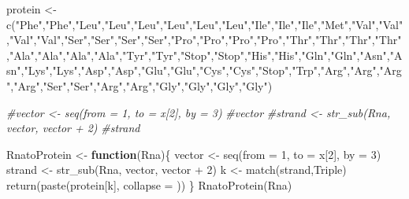 \documentclass[
]{article}
\newenvironment{Shaded}{\begin{snugshade}}{\end{snugshade}}
\newcommand{\AttributeTok}[1]{\textcolor[rgb]{0.77,0.63,0.00}{#1}}
\newcommand{\CommentTok}[1]{\textcolor[rgb]{0.56,0.35,0.01}{\textit{#1}}}
\newcommand{\ControlFlowTok}[1]{\textcolor[rgb]{0.13,0.29,0.53}{\textbf{#1}}}
\newcommand{\DecValTok}[1]{\textcolor[rgb]{0.00,0.00,0.81}{#1}}
\newcommand{\FunctionTok}[1]{\textcolor[rgb]{0.00,0.00,0.00}{#1}}
\newcommand{\NormalTok}[1]{#1}
\newcommand{\OtherTok}[1]{\textcolor[rgb]{0.56,0.35,0.01}{#1}}
\newcommand{\SpecialCharTok}[1]{\textcolor[rgb]{0.00,0.00,0.00}{#1}}
\newcommand{\StringTok}[1]{\textcolor[rgb]{0.31,0.60,0.02}{#1}}
\begin{document}
\begin{Shaded}
\begin{Highlighting}[]
\NormalTok{protein }\OtherTok{\textless{}{-}} \FunctionTok{c}\NormalTok{(}\StringTok{"Phe"}\NormalTok{,}\StringTok{"Phe"}\NormalTok{,}\StringTok{"Leu"}\NormalTok{,}\StringTok{"Leu"}\NormalTok{,}\StringTok{"Leu"}\NormalTok{,}\StringTok{"Leu"}\NormalTok{,}\StringTok{"Leu"}\NormalTok{,}\StringTok{"Leu"}\NormalTok{,}\StringTok{"Ile"}\NormalTok{,}\StringTok{"Ile"}\NormalTok{,}\StringTok{"Ile"}\NormalTok{,}\StringTok{"Met"}\NormalTok{,}\StringTok{"Val"}\NormalTok{,}\StringTok{"Val"}\NormalTok{,}\StringTok{"Val"}\NormalTok{,}\StringTok{"Val"}\NormalTok{,}\StringTok{"Ser"}\NormalTok{,}\StringTok{"Ser"}\NormalTok{,}\StringTok{"Ser"}\NormalTok{,}\StringTok{"Ser"}\NormalTok{,}\StringTok{"Pro"}\NormalTok{,}\StringTok{"Pro"}\NormalTok{,}\StringTok{"Pro"}\NormalTok{,}\StringTok{"Pro"}\NormalTok{,}\StringTok{"Thr"}\NormalTok{,}\StringTok{"Thr"}\NormalTok{,}\StringTok{"Thr"}\NormalTok{,}\StringTok{"Thr"}\NormalTok{,}\StringTok{"Ala"}\NormalTok{,}\StringTok{"Ala"}\NormalTok{,}\StringTok{"Ala"}\NormalTok{,}\StringTok{"Ala"}\NormalTok{,}\StringTok{"Tyr"}\NormalTok{,}\StringTok{"Tyr"}\NormalTok{,}\StringTok{"Stop"}\NormalTok{,}\StringTok{"Stop"}\NormalTok{,}\StringTok{"His"}\NormalTok{,}\StringTok{"His"}\NormalTok{,}\StringTok{"Gln"}\NormalTok{,}\StringTok{"Gln"}\NormalTok{,}\StringTok{"Asn"}\NormalTok{,}\StringTok{"Asn"}\NormalTok{,}\StringTok{"Lys"}\NormalTok{,}\StringTok{"Lys"}\NormalTok{,}\StringTok{"Asp"}\NormalTok{,}\StringTok{"Asp"}\NormalTok{,}\StringTok{"Glu"}\NormalTok{,}\StringTok{"Glu"}\NormalTok{,}\StringTok{"Cys"}\NormalTok{,}\StringTok{"Cys"}\NormalTok{,}\StringTok{"Stop"}\NormalTok{,}\StringTok{"Trp"}\NormalTok{,}\StringTok{"Arg"}\NormalTok{,}\StringTok{"Arg"}\NormalTok{,}\StringTok{"Arg"}\NormalTok{,}\StringTok{"Arg"}\NormalTok{,}\StringTok{"Ser"}\NormalTok{,}\StringTok{"Ser"}\NormalTok{,}\StringTok{"Arg"}\NormalTok{,}\StringTok{"Arg"}\NormalTok{,}\StringTok{"Gly"}\NormalTok{,}\StringTok{"Gly"}\NormalTok{,}\StringTok{"Gly"}\NormalTok{,}\StringTok{"Gly"}\NormalTok{)}

\CommentTok{\#vector \textless{}{-} seq(from = 1, to = x[2], by = 3)}
\CommentTok{\#vector}
\CommentTok{\#strand \textless{}{-} str\_sub(Rna, vector, vector + 2)}
\CommentTok{\#strand}


\NormalTok{RnatoProtein }\OtherTok{\textless{}{-}} \ControlFlowTok{function}\NormalTok{(Rna)\{}
\NormalTok{  vector }\OtherTok{\textless{}{-}} \FunctionTok{seq}\NormalTok{(}\AttributeTok{from =} \DecValTok{1}\NormalTok{, }\AttributeTok{to =}\NormalTok{ x[}\DecValTok{2}\NormalTok{], }\AttributeTok{by =} \DecValTok{3}\NormalTok{)}
\NormalTok{  strand }\OtherTok{\textless{}{-}} \FunctionTok{str\_sub}\NormalTok{(Rna, vector, vector }\SpecialCharTok{+} \DecValTok{2}\NormalTok{)}
\NormalTok{  k }\OtherTok{\textless{}{-}} \FunctionTok{match}\NormalTok{(strand,Triple)}
  \FunctionTok{return}\NormalTok{(}\FunctionTok{paste}\NormalTok{(protein[k], }\AttributeTok{collapse =} \StringTok{\textquotesingle{}\textquotesingle{}}\NormalTok{))}
\NormalTok{\}}
\FunctionTok{RnatoProtein}\NormalTok{(Rna)}
\end{Highlighting}
\end{Shaded}
\end{document}
